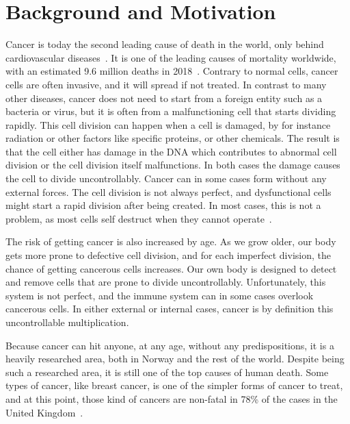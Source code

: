 \section{Background and Motivation}

Cancer is today the second leading cause of death in the world, only behind cardiovascular diseases~\cite{WHODEATH}. 
It is one of the leading causes of mortality worldwide, with an estimated 9.6 million deaths in 2018~\cite{WHOCANCER}.
Contrary to normal cells, cancer cells are often invasive, and it will spread if not treated. 
In contrast to many other diseases, cancer does not need to start from a foreign entity such as a bacteria or virus, but it is often from a malfunctioning cell that starts dividing rapidly. 
This cell division can happen when a cell is damaged, by for instance radiation or other factors like specific proteins, or other chemicals. The result is that the cell either has damage in the DNA which contributes to abnormal cell division or the cell division itself malfunctions. In both cases the damage causes the cell to divide uncontrollably. 
Cancer can in some cases form without any external forces. The cell division is not always perfect, and dysfunctional cells might start a rapid division after being created. In most cases, this is not a problem, as most cells self destruct when they cannot operate~\cite{selfdestruction,apoptosis}. 

The risk of getting cancer is also increased by age. As we grow older, our body gets more prone to defective cell division, and for each imperfect division, the chance of getting cancerous cells increases.  
Our own body is designed to detect and remove cells that are prone to divide uncontrollably. Unfortunately, this system is not perfect, and the immune system can in some cases overlook cancerous cells.
In either external or internal cases, cancer is by definition this uncontrollable multiplication.




Because cancer can hit anyone, at any age, without any predispositions, it is a heavily researched area, both in Norway and the rest of the world. Despite being such a researched area, it is still one of the top causes of human death. 
Some types of cancer, like breast cancer, is one of the simpler forms of cancer to treat, and at this point, those kind of cancers are non-fatal in 78\% of the cases in the United Kingdom~\cite{UKCancer}. 
    

